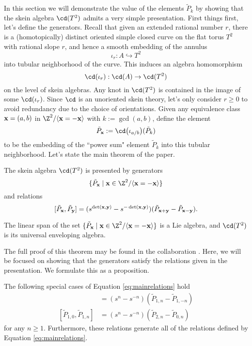 In this section we will demonstrate the value of the elements $\tilde{P}_k$  by showing that the skein algebra $\cd(T^2)$ admits a very simple presentation. First things first, let's define the generators. Recall that given an extended rational number $r$, there is a (homotopically) distinct oriented simple closed curve on the flat torus $T^2$ with rational slope $r$, and hence a smooth embedding of the annulus 
\[
\iota_r: A \hookrightarrow T^2
\]
into tubular neighborhood of the curve. This induces an algebra homomorphism
\[
\cd(\iota_r): \cd(A) \to \cd(T^2)
\]
on the level of skein algebras. Any knot in $\cd(T^2)$ is contained in the image of some $\cd(\iota_r)$. Since $\cd$ is an unoriented skein theory, let's only consider $r \geq 0$ to avoid redundancy due to the choice of orientations. Given any equivalence class ${\mathbf{x}} = (a, b)$ in $\Z^2 / \langle \xx = - \xx \rangle$ with $k := \gcd(a, b)$, define the element
\[
\tilde{P}_\xx := \cd\big(\iota_{a/b}\big)(\tilde{P}_k)
\]
to be the embedding of the ``power sum" element $\tilde{P}_k$ into this tubular neighborhood. Let's state the main theorem of the paper.

\begin{theorem} \label{thm:toruspresentation}
The skein algebra $\cd(T^2)$ is presented by generators 
\[
\{ \tilde{P}_\xx \mid \xx \in \Z^2 / \langle \xx = - \xx \rangle \}
\]
and relations
\begin{equation} \label{eq:mainrelations}
[\tilde{P}_{\mathbf{x}}, \tilde{P}_{\mathbf{y}}] = (s^{\det({\mathbf{x}}, {\mathbf{y}})} - s^{-\det({\mathbf{x}}, {\mathbf{y}})}) (\tilde{P}_{{\mathbf{x}} + {\mathbf{y}}} - \tilde{P}_{{\mathbf{x}} - {\mathbf{y}}}).
\end{equation}
\end{theorem}

\begin{corollary} \label{cor:liealgebra1}
The linear span of the set $\{ \tilde{P}_\xx \mid \xx \in \Z^2 / \langle \xx = - \xx \rangle \}$ is a Lie algebra, and  $\cd(T^2)$ is its universal enveloping algebra. 
\end{corollary}

The full proof of this theorem may be found in the collaboration . Here, we will be focused on showing that the generators satisfy the relations given in the presentation. We formulate this as a proposition.
\begin{proposition}
The following special cases of Equation \eqref{eq:mainrelations} hold
\begin{align}
[\tilde{P}_{1, 0}, \tilde{P}_{0, n}] &= (s^n - s^{-n}) (\tilde{P}_{1, n} - \tilde{P}_{1, -n}) \label{eq:perprelations} \\
[\tilde{P}_{1, 0}, \tilde{P}_{1, n}] &= (s^n - s^{-n}) (\tilde{P}_{2, n} - \tilde{P}_{0, n}) \label{eq:angledrelations}
\end{align}
for any $n \geq 1$. Furthermore, these relations generate all of the relations defined by Equation \eqref{eq:mainrelations}.
\end{proposition}

